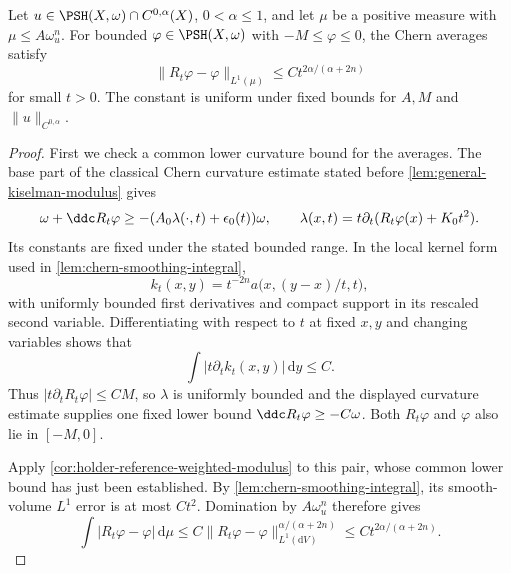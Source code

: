 \begin{lemma}\label{lem:holder-reference-chern-error}
Let $u\in\PSH(X,\omega)\cap C^{0,\alpha}(X)$, $0<\alpha\leq1$, and let $\mu$ be a positive measure with $\mu\leq A\omega_u^n$. For bounded $\varphi\in\PSH(X,\omega)$ with $-M\leq\varphi\leq0$, the Chern averages satisfy
\[
 \|R_t\varphi-\varphi\|_{L^1(\mu)}
 \leq C t^{2\alpha/(\alpha+2n)}
\]
for small $t>0$. The constant is uniform under fixed bounds for $A,M$ and $\|u\|_{C^{0,\alpha}}$.
\end{lemma}
\begin{proof}
First we check a common lower curvature bound for the averages. The base part of the classical Chern curvature estimate stated before \cref{lem:general-kiselman-modulus} gives
\[
 \omega+\ddc R_t\varphi
 \geq-(A_0\lambda(\cdot,t)+\epsilon_0(t))\omega,
 \qquad \lambda(x,t)=t\partial_t(R_t\varphi(x)+K_0t^2).
\]
Its constants are fixed under the stated bounded range. In the local kernel form used in \cref{lem:chern-smoothing-integral},
\[
 k_t(x,y)=t^{-2n}a\bigl(x,(y-x)/t,t\bigr),
\]
with uniformly bounded first derivatives and compact support in its rescaled second variable. Differentiating with respect to $t$ at fixed $x,y$ and changing variables shows that
\[
 \int|t\partial_t k_t(x,y)|\,\mathrm dy\leq C.
\]
Thus $|t\partial_tR_t\varphi|\leq CM$, so $\lambda$ is uniformly bounded and the displayed curvature estimate supplies one fixed lower bound $\ddc R_t\varphi\geq-C\omega$. Both $R_t\varphi$ and $\varphi$ also lie in $[-M,0]$.

Apply \cref{cor:holder-reference-weighted-modulus} to this pair, whose common lower bound has just been established. By \cref{lem:chern-smoothing-integral}, its smooth-volume $L^1$ error is at most $Ct^2$. Domination by $A\omega_u^n$ therefore gives
\[
 \int|R_t\varphi-\varphi|\,\mathrm d\mu
 \leq C\|R_t\varphi-\varphi\|_{L^1(\mathrm dV)}^{\alpha/(\alpha+2n)}
 \leq Ct^{2\alpha/(\alpha+2n)}.
\]
\end{proof}
